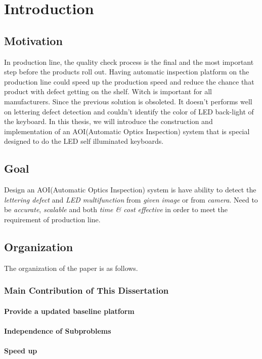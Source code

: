 \chapter{Introduction}
\label{c:intro}

\section{Motivation}
\label{section:motivation}
In production line, the quality check process is the final and the most important step before the products roll out. 
Having automatic inspection platform on the production line could speed up the production speed and reduce the chance that product with defect getting on the shelf. Witch is important for all manufacturers.
Since the previous solution is obsoleted. It doesn't performs well on lettering defect detection and couldn't identify the color of LED back-light of the keyboard.
In this thesis, we will introduce the construction and implementation of an AOI(Automatic Optics Inspection) system that is special designed to do the LED self illuminated keyboards. 


\section{Goal}
\label{section:goal}
Design an AOI(Automatic Optics Inspection) system is have ability to detect the \emph{lettering defect} and \emph{LED multifunction} from \emph{given image} or from \emph{camera}.
Need to be \emph{accurate}, \emph{scalable} and both \emph{time \& cost effective} in order to meet the requirement of production line.

\section{Organization}
\label{section:organization}
The organization of the paper is as follows. 

\subsection{Main Contribution of This Dissertation}
\label{subsec:advantages}

\subsubsection{Provide a updated baseline platform}


\subsubsection{Independence of Subproblems}


\subsubsection{Speed up}
